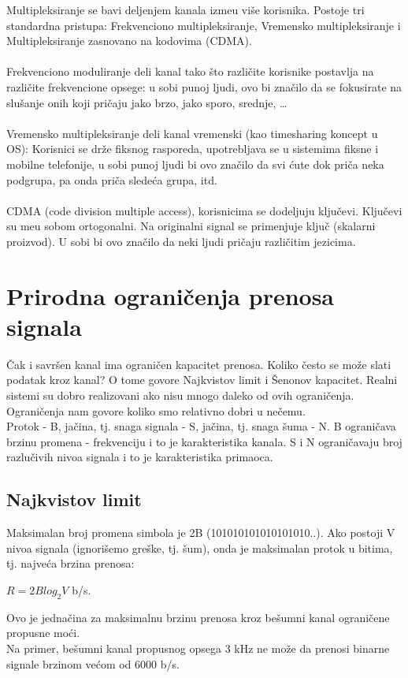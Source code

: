 \documentclass{article} %
\begin{document}
Multipleksiranje se bavi deljenjem kanala izme\dj  u vi\v se  korisnika.
Postoje tri standardna pristupa: Frekvenciono multipleksiranje, Vremensko multipleksiranje i Multipleksiranje zasnovano na kodovima (CDMA).
\\ 
\\ Frekvenciono moduliranje deli kanal tako \v sto razli\v cite korisnike postavlja na  razli\v cite frekvencione opsege: u sobi punoj ljudi, ovo bi zna\v cilo da se fokusirate na slu\v sanje onih koji pri\v caju jako brzo, jako sporo, srednje, \dots
\\
\\ Vremensko multipleksiranje deli kanal vremenski (kao timesharing  koncept u OS): Korisnici se dr\v ze fiksnog rasporeda, upotrebljava se u sistemima fiksne i mobilne telefonije, u sobi punoj ljudi bi ovo zna\v cilo da svi \' cute dok pri\v ca neka podgrupa, pa onda pri\v ca slede\' ca grupa, itd.
\\
\\ CDMA (code division multiple access), korisnicima se dodeljuju 
klju\v cevi. Klju\v cevi su me\dj u sobom ortogonalni. Na originalni signal se primenjuje klju\v c (skalarni proizvod). U sobi bi ovo zna\v cilo da neki ljudi pri\v caju razli\v citim jezicima.


\section{Prirodna ograničenja prenosa signala}
Čak i savršen kanal ima ograničen kapacitet prenosa.
Koliko često se može slati podatak kroz kanal? O tome govore Najkvistov limit i Šenonov kapacitet. Realni sistemi su dobro realizovani ako nisu mnogo daleko od ovih ograničenja. Ograničenja nam govore koliko smo relativno dobri u nečemu.\\
Protok - B, jačina, tj. snaga signala - S, jačina, tj. snaga šuma - N. B ograničava brzinu promena - frekvenciju i to je karakteristika kanala. S i N ograničavaju broj razlučivih nivoa signala i to je karakteristika primaoca.\subsection{Najkvistov limit}
Maksimalan broj promena simbola je 2B (101010101010101010..). Ako postoji V nivoa signala (ignorišemo greške, tj. šum), onda je maksimalan protok u bitima, tj. najveća brzina prenosa:
\begin{center}
 $ R=2B log_{2} V$  b/s.
\end{center}
Ovo je jednačina za maksimalnu brzinu prenosa kroz bešumni kanal ograničene propusne moći. \\
Na primer, bešumni kanal propusnog opsega 3 kHz ne može da prenosi binarne signale brzinom većom od 6000 b/s.
\end{document}
